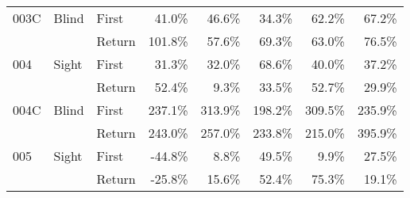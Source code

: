 \begin{table}[!htb]
\begin{tabular}{lllrrrrr}
003C & Blind & First &   41.0\% &   46.6\% &                                                34.3\% &                                                 62.2\% &   67.2\% \\
    &       & Return &  101.8\% &   57.6\% &                                                69.3\% &                                                 63.0\% &   76.5\% \\
004 & Sight & First &   31.3\% &   32.0\% &                                                68.6\% &                                                 40.0\% &   37.2\% \\
    &       & Return &   52.4\% &    9.3\% &                                                33.5\% &                                                 52.7\% &   29.9\% \\
004C & Blind & First &  237.1\% &  313.9\% &                                               198.2\% &                                                309.5\% &  235.9\% \\
    &       & Return &  243.0\% &  257.0\% &                                               233.8\% &                                                215.0\% &  395.9\% \\
005 & Sight & First &  -44.8\% &    8.8\% &                                                49.5\% &                                                  9.9\% &   27.5\% \\
    &       & Return &  -25.8\% &   15.6\% &                                                52.4\% &                                                 75.3\% &   19.1\% \\
\bottomrule
\end{tabular}
\end{table}

